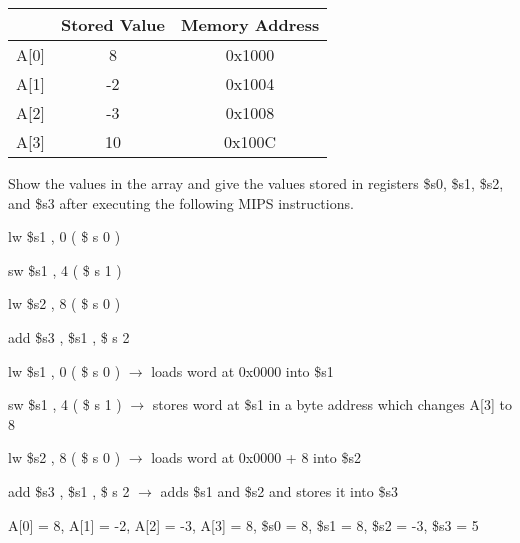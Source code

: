 \documentclass{article}
\begin{document}
\begin{center}
    \begin{tabular}{c|c|c}
         & Stored Value &  Memory Address\\
         \hline
         A[0] & 8 & 0x1000\\
         A[1] & -2 & 0x1004 \\
         A[2] & -3 & 0x1008 \\
         A[3] &  10 & 0x100C 
    \end{tabular}
\end{center}

Show the values in the array and give the values stored in registers \$s0, \$s1, \$s2, and \$s3 after executing the following MIPS instructions.
\vspace{5mm}

lw   \$s1 ,   0 ( \$ s 0 )

sw   \$s1 ,   4 ( \$ s 1 )

lw   \$s2 ,   8 ( \$ s 0 )

add   \$s3 ,   \$s1 ,   \$ s 2

\vspace{5mm}

lw   \$s1 ,   0 ( \$ s 0 ) $\rightarrow$ loads word at 0x0000 into \$s1

sw   \$s1 ,   4 ( \$ s 1 ) $\rightarrow$ stores word at \$s1 in a byte address which changes A[3] to 8

lw   \$s2 ,   8 ( \$ s 0 ) $\rightarrow$ loads word at 0x0000 + 8 into \$s2

add  \$s3 , \$s1 , \$ s 2 $\rightarrow$ adds \$s1 and \$s2 and stores it into \$s3

\begin{center}
    A[0] = 8, A[1] = -2, A[2] = -3, A[3] = 8, \$s0 = 8, \$s1 = 8, \$s2 = -3, \$s3 = 5
\end{center}


\newpage
\end{document}

